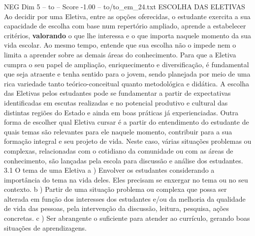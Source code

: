 \begin{textsample}{NEG Dim 5 – to – Score -1.00 – to/to\_em\_24.txt}  \label{ex:f5_neg_261}
ESCOLHA DAS ELETIVAS Ao decidir por uma Eletiva, entre as opções oferecidas, o estudante exercita a sua capacidade de escolha com base num repertório ampliado, aprende a estabelecer critérios, \textbf{valorando} o que lhe interessa e o que importa naquele momento da sua vida escolar.
Ao mesmo tempo, entende que sua escolha não o impede nem o limita a aprender sobre as demais áreas do conhecimento.
Para que a Eletiva cumpra o seu papel de ampliação, enriquecimento e diversificação, é fundamental que seja atraente e tenha sentido para o jovem, sendo planejada por meio de uma rica variedade tanto teórico-conceitual quanto metodológica e didática.
A escolha das Eletivas pelos estudantes pode se fundamentar a partir de expectativas identificadas em escutas realizadas e no potencial produtivo e cultural das distintas regiões do Estado e ainda em boas práticas já experienciadas.
Outra forma de escolher qual Eletiva cursar é a partir do entendimento do estudante de quais temas são relevantes para ele naquele momento, contribuir para a sua formação integral e seu projeto de vida.
Neste caso, várias situações problemas ou complexas, relacionadas com o cotidiano da comunidade ou com as áreas de conhecimento, são lançadas pela escola para discussão e análise dos estudantes. 3.1 O tema de uma Eletiva a ) Envolver os estudantes considerando a importância do tema na vida deles.
Eles precisam se enxergar no tema ou no seu contexto. b ) Partir de uma situação problema ou complexa que possa ser alterada em função dos interesses dos estudantes e/ou da melhoria da qualidade de vida das pessoas, pela intervenção da discussão, leitura, pesquisa, ações concretas. c ) Ser abrangente o suficiente para atender ao currículo, gerando boas situações de aprendizagens.

\end{textsample}
